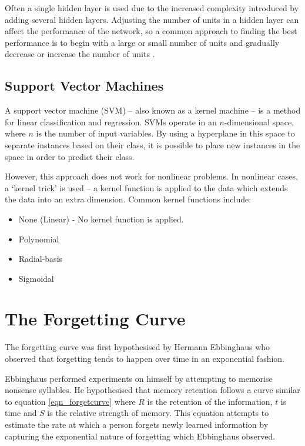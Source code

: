 Often a single hidden layer is used due to the increased complexity introduced by adding
several hidden layers. Adjusting the number of units in a hidden layer can affect the performance
of the network, so a common approach to finding the best performance is to begin with a large or
small number of units and gradually decrease or increase the number of units \cite{intro_to_machine_learning_2010}.

\subsection{Support Vector Machines}

A support vector machine (SVM) -- also known as a kernel machine -- is a method for
linear classification and regression. SVMs operate in an $n$-dimensional space, where
$n$ is the number of input variables. By using a hyperplane in this space to separate
instances based on their class, it is possible to place new instances in the space
in order to predict their class.

However, this approach does not work for nonlinear problems. In nonlinear cases, a `kernel trick'
is used -- a kernel function is applied to the data which extends the data into an extra
dimension. Common kernel functions include:

\begin{itemize}
\item None (Linear) - No kernel function is applied.
\item Polynomial
\item Radial-basis
\item Sigmoidal
\end{itemize}


\section{The Forgetting Curve} \label{background_forgettingcurves}
The forgetting curve was first hypothesised by Hermann
Ebbinghaus\cite{ebbinghaus_memory:_1913} who observed that forgetting tends
to happen over time in an exponential fashion.

Ebbinghaus performed experiments on himself by attempting to memorise nonsense
syllables. He hypothesised that memory retention follows a curve similar to
equation \ref{eqn_forgetcurve} where $R$ is the retention of the information,
$t$ is time and $S$ is the relative strength of memory. This equation attempts to
estimate the rate at which a person forgets newly learned information by capturing
the exponential nature of forgetting which Ebbinghaus observed.

